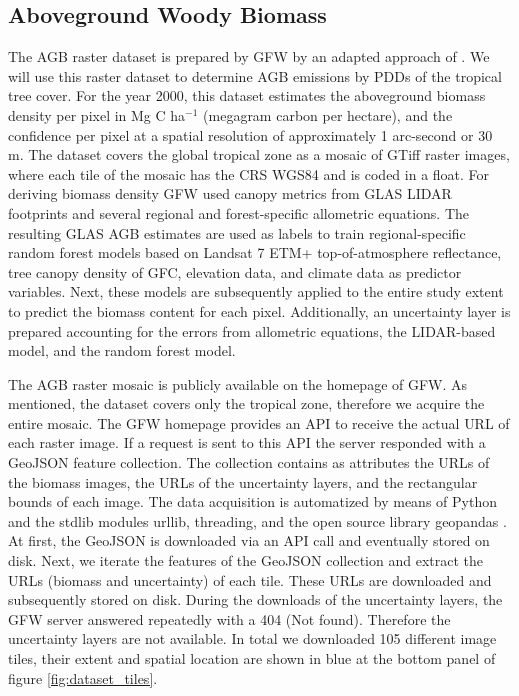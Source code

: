 	\subsection{Aboveground Woody Biomass}
		The \ac{AGB} raster dataset is prepared by \ac{GFW} by an adapted approach of \citet{Baccini2012,Baccini2015,Baccini2017}. We will use this raster dataset to determine \ac{AGB} emissions by \acp{PDD} of the tropical tree cover. For the year 2000, this dataset estimates the aboveground biomass density per pixel in Mg C ha$^{-1}$ (megagram carbon per hectare), and the confidence per pixel at a spatial resolution of approximately 1 arc-second or 30 m. The dataset covers the global tropical zone as a mosaic of \ac{GTiff} raster images, where each tile of the mosaic has the \ac{CRS} \ac{WGS84} and is coded in a float. For deriving biomass density \ac{GFW} used canopy metrics from \ac{GLAS} \ac{LIDAR} footprints and several regional and forest-specific allometric equations. The resulting \ac{GLAS} \ac{AGB} estimates are used as labels to train regional-specific random forest models based on Landsat 7 ETM+ top-of-atmosphere reflectance, tree canopy density of \ac{GFC}, elevation data, and climate data as predictor variables. Next, these models are subsequently applied to the entire study extent to predict the biomass content for each pixel. Additionally, an uncertainty layer is prepared accounting for the errors from allometric equations, the \ac{LIDAR}-based model, and the random forest model.

		The \ac{AGB} raster mosaic is publicly available on the homepage of \ac{GFW}. As mentioned, the dataset covers only the tropical zone, therefore we acquire the entire mosaic. The \ac{GFW} homepage provides an \ac{API} to receive the actual \ac{URL} of each raster image. If a request is sent to this \ac{API} the server responded with a \ac{GeoJSON} feature collection. The collection contains as attributes the \acp{URL} of the biomass images, the \acp{URL} of the uncertainty layers, and the rectangular bounds of each image. The data acquisition is automatized by means of Python and the \ac{stdlib} modules urllib, threading, and the open source library geopandas \citep{Rossum2018,McKinney2010}. At first, the \ac{GeoJSON} is downloaded via an \ac{API} call and eventually stored on disk. Next, we iterate the features of the \ac{GeoJSON} collection and extract the \ac{URL}s (biomass and uncertainty) of each tile. These \ac{URL}s are downloaded and subsequently stored on disk. During the downloads of the uncertainty layers, the \ac{GFW} server answered repeatedly with a 404 (Not found). Therefore the uncertainty layers are not available. In total we downloaded 105 different image tiles, their extent and spatial location are shown in blue at the bottom panel of figure \ref{fig:dataset_tiles}.

